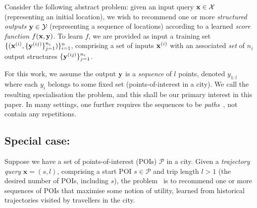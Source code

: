 Consider the following abstract problem:
given an input query $\mathbf{x} \in \mathcal{X}$ (representing an initial location),
we wish to recommend one or more \emph{structured outputs} $\mathbf{y} \in \mathcal{Y}$ (representing a sequence of locations)
according to a learned \emph{score function} $f(\mathbf{x},\mathbf{y})$.
To learn $f$,
we are provided as input a training set
$\{ ( \mathbf{x}^{({i})}, \{ \mathbf{y}^{({ij})} \}_{j=1}^{n_i} ) \}_{i=1}^{n}$,
comprising a set %
of inputs $\mathbf{x}^{({i})}$ with an associated \emph{set} of $n_i$ output structures $\{ \mathbf{y}^{({ij})} \}_{j=1}^{n_i}$.

For this work, we assume the output $\mathbf{y}$ is a \emph{sequence} of $l$ points, denoted $y_{1:l}$
where each $y_i$ belongs to some fixed set (\eg points-of-interest in a city).
We call the resulting specialisation the \emph{{\seqrec}} problem,
and this shall be our primary interest in this paper.
In many settings, one further requires the sequences to be \emph{paths}~\cite{west2001introduction}, \ie not contain any repetitions.





\subsection{Special case: {\trajrec}}

Suppose we have a set of points-of-interest (POIs) $\mathcal{P}$ in a city.
Given a \emph{trajectory query} $\mathbf{x} = (s, l)$,
comprising a start POI $s \in \mathcal{P}$ and trip length
$l \!>\! 1$ (\ie the desired number of POIs, including $s$),
the \emph{\trajrec} problem~\cite{bao2015recommendations,zheng2015trajectory} is to
recommend one or more sequences of POIs %
that maximise some notion of utility,
learned from %
historical
trajectories visited by travellers in the city.

